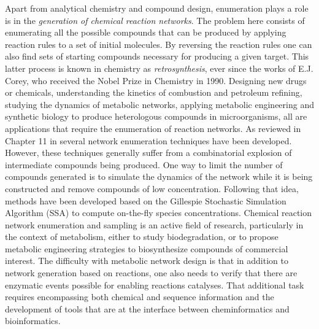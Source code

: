 \documentclass{sig-alternate}
\begin{document}
%
Apart from analytical chemistry and compound design, enumeration plays a role is in the \emph{generation
  of chemical reaction networks}. The problem here consists of
enumerating all the possible compounds that can be produced by
applying reaction rules to a set of initial molecules. By reversing
the reaction rules one can also find sets of starting compounds
necessary for producing a given target. This latter process is known
in chemistry as \emph{retrosynthesis}, ever since the works of
E.J. Corey, who received the Nobel Prize in Chemistry in
1990. Designing new drugs or chemicals, understanding the kinetics of
combustion and petroleum refining, studying the dynamics of metabolic
networks, applying metabolic engineering and synthetic biology to
produce heterologous compounds in microorganisms, all are applications
that require the enumeration of reaction networks. As reviewed in
Chapter 11 in \cite{faulon2010} several network enumeration techniques
have been developed. However, these techniques generally suffer from a
combinatorial explosion of intermediate compounds being produced. One
way to limit the number of compounds generated is to simulate the
dynamics of the network while it is being constructed and remove
compounds of low concentration. Following that idea, methods have been
developed based on the Gillespie Stochastic Simulation Algorithm (SSA)
to compute on-the-fly species concentrations. Chemical reaction
network enumeration and sampling is an active field of research,
particularly in the context of metabolism, either to study
biodegradation, or to propose metabolic engineering strategies to
biosynthesize compounds of commercial interest. The difficulty with
metabolic network design is that in addition to network generation
based on reactions, one also needs to verify that there are enzymatic
events possible for enabling reactions catalyses. That additional task
requires encompassing both chemical and sequence information and the
development of tools that are at the interface between
cheminformatics and bioinformatics.
\end{document}
